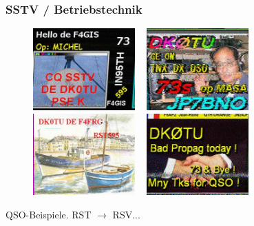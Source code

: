 \begin{frame}
  \frametitle{SSTV / Betriebstechnik}

  \begin{center}
    \begin{figure}
      \includegraphics[width=0.35\textwidth,height=.35\textheight,keepaspectratio]{e16/sstv_qso_201306141504-F4GIS.jpg}
      ~
      \includegraphics[width=0.35\textwidth,height=.35\textheight,keepaspectratio]{e16/sstv_qso_201306141947-JP7BNO.jpg}
      \\[1em]
      \includegraphics[width=0.35\textwidth,height=.35\textheight,keepaspectratio]{e16/sstv_qso_201307141440-F4FRG.jpg}
      ~
      \includegraphics[width=0.35\textwidth,height=.35\textheight,keepaspectratio]{e16/sstv_qso_201307151417-F6APZ.jpg}
    \end{figure}
  \end{center}

  \centering QSO-Beispiele. RST $\rightarrow$ RSV...

\end{frame}

